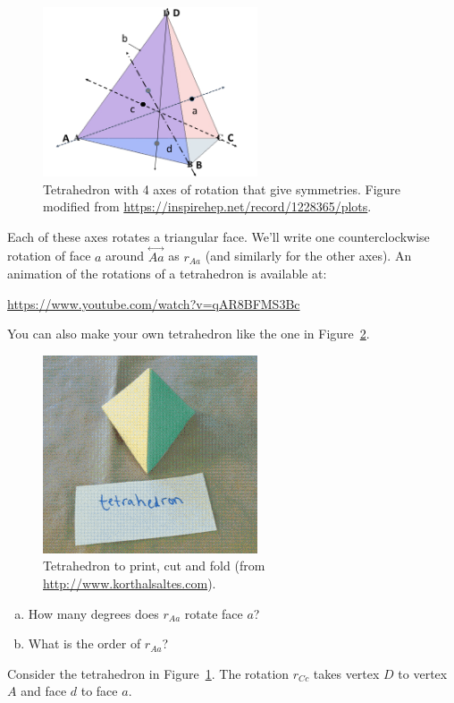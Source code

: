 \begin{figure}[ht]
\begin{center}
\includegraphics[width=2.5in]{images/TetrahedronC.png}
\caption{\label{fig:TetRot}Tetrahedron with 4 axes of rotation that give symmetries. Figure modified  from \url{https://inspirehep.net/record/1228365/plots}.}
\end{center}
\end{figure}


Each of these axes rotates a triangular face. We'll write one counterclockwise rotation of face $a$ around $\overset{\leftrightarrow}{Aa}$ as $r_{Aa}$ (and similarly for the other axes).
An animation of the rotations of a tetrahedron is available at:

\url{https://www.youtube.com/watch?v=qAR8BFMS3Bc}

You can also make your own tetrahedron like the one in Figure~\ref{fig:TetraFold}.

\begin{figure}[ht]
\begin{center}
\includegraphics[width=2.5in]{images/TetrahedronFold.png}
\caption{\label{fig:TetraFold}Tetrahedron to print, cut and fold 
(from \url{http://www.korthalsaltes.com}).}
 
\end{center}
\end{figure}

\begin{exercise}\label{exercise:actions:Tetra 1}
\begin{enumerate}[(a)]
\item How many degrees does $ r_{Aa}$ rotate face $a$?
\item What is the order of $r_{Aa}$?
\end{enumerate}

\end{exercise}
Consider the tetrahedron in Figure~\ref{fig:TetRot}.  The rotation $r_{Cc}$ takes vertex $D$ to vertex $A$ and face $d$ to face $a$.  

